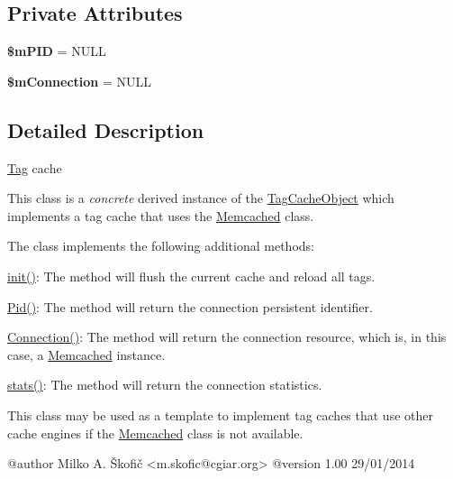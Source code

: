 \subsection*{Private Attributes}
\begin{DoxyCompactItemize}
\item 
\hypertarget{class_ontology_wrapper_1_1_tag_cache_a42e4e43a5fe659d1eb9a756bfe3a9fb0}{{\bfseries \$m\-P\-I\-D} = N\-U\-L\-L}\label{class_ontology_wrapper_1_1_tag_cache_a42e4e43a5fe659d1eb9a756bfe3a9fb0}

\item 
\hypertarget{class_ontology_wrapper_1_1_tag_cache_a8e30af2e9bcca11d86da598df580cd09}{{\bfseries \$m\-Connection} = N\-U\-L\-L}\label{class_ontology_wrapper_1_1_tag_cache_a8e30af2e9bcca11d86da598df580cd09}

\end{DoxyCompactItemize}


\subsection{Detailed Description}
\hyperlink{class_ontology_wrapper_1_1_tag}{Tag} cache

This class is a {\itshape concrete} derived instance of the \hyperlink{class_ontology_wrapper_1_1_tag_cache_object}{Tag\-Cache\-Object} which implements a tag cache that uses the \hyperlink{}{Memcached} class.

The class implements the following additional methods\-:


\begin{DoxyItemize}
\item {\ttfamily \hyperlink{class_ontology_wrapper_1_1_tag_cache_ae64d13e0014dd859a1f44e2fa445f2a9}{init()}}\-: The method will flush the current cache and reload all tags. 
\item {\ttfamily \hyperlink{}{Pid()}}\-: The method will return the connection persistent identifier. 
\item {\ttfamily \hyperlink{class_ontology_wrapper_1_1_tag_cache_a205ab6592fa82d6a3265d20fda2c3721}{Connection()}}\-: The method will return the connection resource, which is, in this case, a \hyperlink{}{Memcached} instance. 
\item {\ttfamily \hyperlink{class_ontology_wrapper_1_1_tag_cache_aaecd49741c55d6fdb7f94d892a84f8d3}{stats()}}\-: The method will return the connection statistics. 
\end{DoxyItemize}

This class may be used as a template to implement tag caches that use other cache engines if the \hyperlink{}{Memcached} class is not available. \begin{DoxyVerb} @author            Milko A. Škofič <m.skofic@cgiar.org>
 @version   1.00 29/01/2014\end{DoxyVerb}
 

